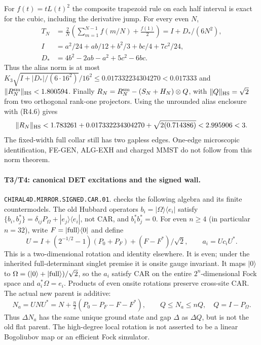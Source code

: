 For $f(t)=tL(t)^2$ the composite trapezoid rule on each half interval
is exact for the cubic, including the derivative jump. For every even $N$,
\[
 \begin{split}
 T_N&=\frac2N\left(\sum_{m=1}^{N-1}f(m/N)+\frac{f(1)}2\right)
       =I+D_* /(6N^2),\\
 I&=a^2/24+ab/12+b^2/3+bc/4+7c^2/24,\\
 D_*&=4b^2-2ab-a^2+5c^2-6bc.
 \end{split}
\]
Thus the alias norm is at most
$K_3\sqrt{I+|D_*|/(6\cdot16^2)}/16^2
\le0.017332234304270<0.017333$ and
$\|R_N^{\rm sm}\|_{\rm HS}<1.800594$.
Finally $R_N=R_N^{\rm sm}-(S_N+H_N)\otimes Q$, with
$\|Q\|_{\rm HS}=\sqrt2$ from two orthogonal rank-one projectors.
Using the unrounded alias enclosure with (R4.6) gives
\[
 \|R_N\|_{\rm HS}
 <1.783261+0.017332234304270+\sqrt{2(0.714386)}
 <2.995906<3.
\]
The fixed-width full collar still has two gapless edges. One-edge
microscopic identification, FE-GEN, ALG-EXH and charged MMST do not follow
from this norm theorem.

\paragraph{T3/T4: canonical DET excitations and the signed wall.}
\texttt{CHIRAL4D.MIRROR.SIGNED.CAR.01}.
checks the following algebra and its finite countermodels.
The old Hubbard operators $b_i=|\Omega\rangle\langle e_i|$ satisfy
$\{b_i,b_j^*\}=\delta_{ij}P_\Omega+|e_j\rangle\langle e_i|$, not CAR,
and $b_i^*b_j^*=0$. For even $n\ge4$ (in particular $n=32$), write
$F=|{\rm full}\rangle\langle0|$ and define
\[
 U=I+(2^{-1/2}-1)(P_0+P_F)+(F-F^*)/\sqrt2,\qquad a_i=Uc_iU^*.
\]
This is a two-dimensional rotation and identity elsewhere. It is even;
under the inherited full-determinant singlet premise it is onsite gauge
invariant. It maps $|0\rangle$ to $\Omega=(|0\rangle+|{\rm full}\rangle)/\sqrt2$,
so the $a_i$ satisfy CAR on the entire $2^n$-dimensional Fock space and
$a_i^*\Omega=e_i$. Products of even onsite rotations preserve cross-site CAR.
The actual new parent is additive:
\[
 N_a=UNU^*=N+\tfrac n2(P_0-P_F-F-F^*),\qquad
 Q\le N_a\le nQ,\quad Q=I-P_\Omega.
\]
Thus $\Delta N_a$ has the same unique ground state and gap $\Delta$ as
$\Delta Q$, but is not the old flat parent. The high-degree local rotation
is not asserted to be a linear Bogoliubov map or an efficient Fock simulator.

